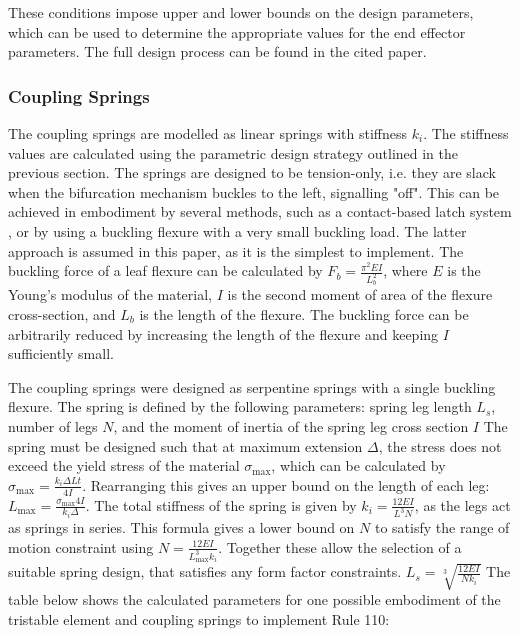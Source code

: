 These conditions impose upper and lower bounds on the design parameters, which can be used to determine the appropriate values for the end effector parameters. The full design process can be found in the cited paper\cite{Gou2021}. 


\subsubsection*{Coupling Springs}
The coupling springs are modelled as linear springs with stiffness \(k_i\). The stiffness values are calculated using the parametric design strategy outlined in the previous section. The springs are designed to be tension-only, i.e. they are slack when the bifurcation mechanism buckles to the left, signalling "off". This can be achieved in embodiment by several methods, such as a contact-based latch system \cite{Gao2019}, or by using a buckling flexure with a very small buckling load. The latter approach is assumed in this paper, as it is the simplest to implement. The buckling force of a leaf flexure can be calculated by \(F_b = \frac{\pi^2EI}{L_b^2}\), where \(E\) is the Young's modulus of the material, \(I\) is the second moment of area of the flexure cross-section, and \(L_b\) is the length of the flexure. The buckling force can be arbitrarily reduced by increasing the length of the flexure and keeping \(I\) sufficiently small. 

The coupling springs were designed as serpentine springs with a single buckling flexure. The spring is defined by the following parameters: spring leg length \(L_s\), number of legs \(N\), and the moment of inertia of the spring leg cross section \(I\)
The spring must be designed such that at maximum extension \(\Delta\), the stress does not exceed the yield stress of the material \(\sigma_{\text{max}}\), which can be calculated by\( \sigma_{\text{max}} = \frac{k_i\Delta L t}{4I} \). Rearranging this gives an upper bound on the length of each leg: \( L_{\text{max}} = \frac{\sigma_{\text{max}}4I}{k_i \Delta} \). The total stiffness of the spring is given by \( k_i = \frac{12E I}{L^3 N} \), as the legs act as springs in series. This formula gives a lower bound on \(N\) to satisfy the range of motion constraint using \( N = \frac{12E I}{L_{\text{max}}^3 k_i} \). Together these allow the selection of a suitable spring design, that satisfies any form factor constraints.
\( L_s = \sqrt[3]{\frac{12E I}{N k_i}} \)
The table below shows the calculated parameters for one possible embodiment of the tristable element and coupling springs to implement Rule 110:


